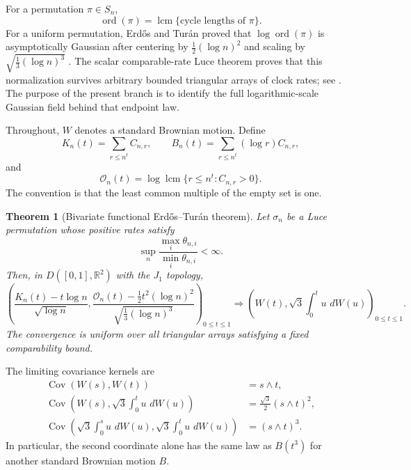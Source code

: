 \documentclass[11pt]{article}
\newtheorem{theorem}{Theorem}[section]
\theoremstyle{definition}
\theoremstyle{remark}
\newcommand{\Cov}{\operatorname{Cov}}
\newcommand{\dd}{\,d}
\newcommand{\ord}{\operatorname{ord}}
\newcommand{\lcm}{\operatorname{lcm}}
\newcommand{\cO}{\mathcal O}
\newcommand{\R}{\mathbb R}
\begin{document}
For a permutation $\pi\in S_n$,
\[
 \ord(\pi)=\lcm\{\text{cycle lengths of }\pi\}.
\]
For a uniform permutation, Erd\H{o}s and Tur\'an proved that
$\log\ord(\pi)$ is asymptotically Gaussian after centering by
$\frac12(\log n)^2$ and scaling by $\sqrt{\frac13(\log n)^3}$
\cite{ErdosTuran1967}.  The scalar comparable-rate Luce theorem proves that
this normalization survives arbitrary bounded triangular arrays of clock
rates; see \cite{LongOrder2026}.  The purpose of the present branch is to
identify the full logarithmic-scale Gaussian field behind that endpoint
law.

Throughout, $W$ denotes a standard Brownian motion.  Define
\begin{equation}\label{eq:processes-intro}
 K_n(t)=\sum_{r\le n^t}C_{n,r},
 \qquad
 B_n(t)=\sum_{r\le n^t}(\log r)C_{n,r},
\end{equation}
and
\begin{equation}\label{eq:order-process-intro}
 \cO_n(t)=\log\lcm\{r\le n^t:C_{n,r}>0\}.
\end{equation}
The convention is that the least common multiple of the empty set is one.

\begin{theorem}[Bivariate functional Erd\H{o}s--Tur\'an theorem]
\label{thm:main-functional}
Let $\sigma_n$ be a Luce permutation whose positive rates satisfy
\[
 \sup_n\frac{\max_i\theta_{n,i}}{\min_i\theta_{n,i}}<\infty.
\]
Then, in $D([0,1],\R^2)$ with the $J_1$ topology,
\begin{equation}\label{eq:main-functional}
 \boxed{
 \left(
 \frac{K_n(t)-t\log n}{\sqrt{\log n}},
 \frac{\cO_n(t)-\frac12t^2(\log n)^2}
      {\sqrt{\frac13(\log n)^3}}
 \right)_{0\le t\le1}
 \Rightarrow
 \left(
 W(t),\sqrt3\int_0^t u\,\dd W(u)
 \right)_{0\le t\le1}.}
\end{equation}
The convergence is uniform over all triangular arrays satisfying a fixed
comparability bound.
\end{theorem}

The limiting covariance kernels are
\begin{align}
 \Cov(W(s),W(t))&=s\wedge t,\label{eq:cov-count-count}\\
 \Cov\left(W(s),\sqrt3\int_0^t u\,\dd W(u)\right)
 &=\frac{\sqrt3}{2}(s\wedge t)^2,\label{eq:cov-count-order}\\
 \Cov\left(\sqrt3\int_0^s u\,\dd W(u),
            \sqrt3\int_0^t u\,\dd W(u)\right)
 &=(s\wedge t)^3.\label{eq:cov-order-order}
\end{align}
In particular, the second coordinate alone has the same law as
$B(t^3)$ for another standard Brownian motion $B$.
\end{document}
